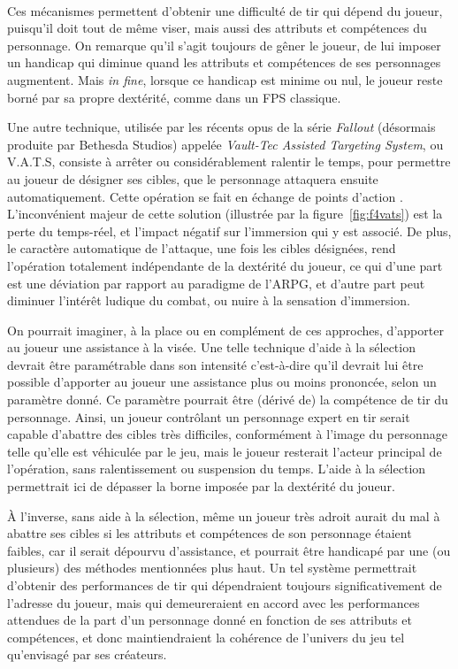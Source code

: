 	\paragraph*{}
	Ces mécanismes permettent d'obtenir une difficulté de tir qui dépend du joueur, puisqu'il doit tout de même viser, mais aussi des attributs et compétences du personnage. On remarque qu'il s'agit toujours de gêner le joueur, de lui imposer un handicap qui diminue quand les attributs et compétences de ses personnages augmentent. Mais \emph{in fine}, lorsque ce handicap est minime ou nul, le joueur reste borné par sa propre dextérité, comme dans un FPS classique.
	
	Une autre technique, utilisée par les récents opus de la série \emph{Fallout} (désormais produite par Bethesda Studios) appelée \emph{Vault-Tec Assisted Targeting System}, ou V.A.T.S, consiste à arrêter ou considérablement ralentir le temps, pour permettre au joueur de désigner ses cibles, que le personnage attaquera ensuite automatiquement. Cette opération se fait en échange de \og points d'action \fg{}. L'inconvénient majeur de cette solution (illustrée par la figure~\ref{fig:f4vats}) est la perte du temps-réel, et l'impact négatif sur l'immersion qui y est associé. De plus, le caractère automatique de l'attaque, une fois les cibles désignées, rend l'opération totalement indépendante de la dextérité du joueur, ce qui d'une part est une déviation par rapport au paradigme de l'ARPG, et d'autre part peut diminuer l'intérêt ludique du combat, ou nuire à la sensation d'immersion.
	
	On pourrait imaginer, à la place ou en complément de ces approches, d'apporter au joueur une assistance à la visée. Une telle technique d'aide à la sélection devrait être paramétrable dans son \og intensité \fg{} c'est-à-dire qu'il devrait lui être possible d'apporter au joueur une assistance plus ou moins prononcée, selon un paramètre donné. Ce paramètre pourrait être (dérivé de) la compétence de tir du personnage. Ainsi, un joueur contrôlant un personnage expert en tir serait capable d'abattre des cibles très difficiles, conformément à l'image du personnage telle qu'elle est véhiculée par le jeu, mais le joueur resterait l'acteur principal de l'opération, sans ralentissement ou suspension du temps. L'aide à la sélection permettrait ici de dépasser la \og borne \fg{} imposée par la dextérité du joueur.
	
	À l'inverse, sans aide à la sélection, même un joueur très adroit aurait du mal à abattre ses cibles si les attributs et compétences de son personnage étaient faibles, car il serait dépourvu d'assistance, et pourrait être handicapé par une (ou plusieurs) des méthodes mentionnées plus haut. Un tel système permettrait d'obtenir des performances de tir qui dépendraient toujours significativement de l'adresse du joueur, mais qui demeureraient en accord avec les performances attendues de la part d'un personnage donné en fonction de ses attributs et compétences, et donc maintiendraient la cohérence de l'univers du jeu tel qu'envisagé par ses créateurs.
	
